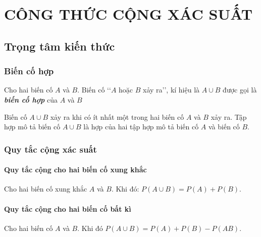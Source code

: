 \setcounter{section}{1}
\section{CÔNG THỨC CỘNG XÁC SUẤT}
\subsection{Trọng tâm kiến thức}
\begin{tomtat}
\subsubsection{Biến cố hợp}
\begin{boxdn}
	{Cho hai biến cố $A$ và $B$. Biến cố \lq\lq $A$ hoặc $B$ xảy ra\rq\rq, kí hiệu là $A\cup B$ được gọi là \textbf{\textit{biến cố hợp}} của $A$ và $B$}
\end{boxdn}
\begin{note}
	{Biến cố $A \cup B$ xảy ra khi có ít nhất một trong hai biến cố $A$ và $B$ xảy ra. Tập hợp mô tả biến cố $A \cup B$ là hợp của hai tập hợp mô tả biến cố $A$ và biến cố $B$.}
\end{note}
\subsubsection{Quy tắc cộng xác suất}
\paragraph{Quy tắc cộng cho hai biến cố xung khắc}
\begin{boxdn}
	{Cho hai biến cố xung khắc $A$ và $B$. Khi đó: $P(A \cup B)=P(A)+P(B)$.}
\end{boxdn}
\paragraph{Quy tắc cộng cho hai biến cố bất kì}
\begin{boxdn}
	{Cho hai biến cố $A$ và $B$. Khi đó $P(A \cup B)=P(A)+P(B)-P(A B)$.}
\end{boxdn}        
\end{tomtat}
